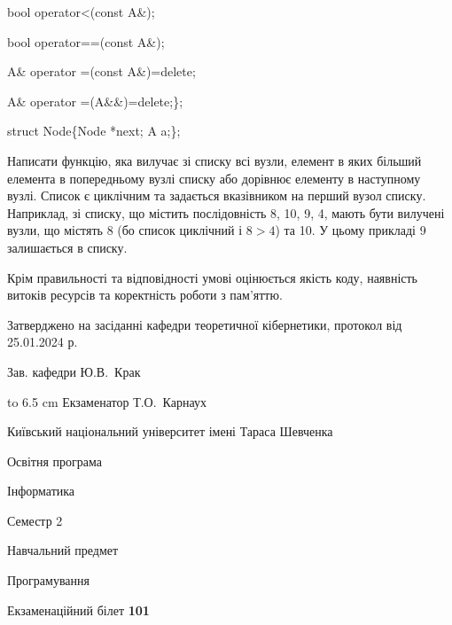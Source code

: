 \documentclass[12pt, ukrainian]{article}
\begin{document}
{\quad  bool operator<(const A\&); 

\quad  bool operator==(const A\&); 

\quad A\& operator =(const A\&)=delete; 

\quad  A\& operator =(A\&\&)=delete;\};

struct Node\{Node *next; A a;\};

 Написати функцію, яка вилучає зі списку всі вузли, елемент в яких більший елемента в попередньому вузлі списку або дорівнює елементу в наступному вузлі. Список є циклічним та задається вказівником на перший вузол списку. Наприклад, зі списку, що містить послідовність 8, 10, 9, 4, мають бути вилучені вузли, що містять 8 (бо список циклічний і $8>4$) та 10. У цьому прикладі 9 залишається в списку.

Крім правильності та відповідності умові оцінюється якість коду, наявність витоків ресурсів та коректність роботи з пам'яттю. 

}
{\smallskip\smallskip \begin {scriptsize} Затверджено на засіданні кафедри теоретичної кібернетики, протокол   від   25.01.2024 р.\par\smallskip\smallskip\smallskip\smallskip
{\parbox {6.5 cm} {Зав. кафедри \dotfill Ю.В.~Крак}}\hspace {0.7cm} {\hbox to 6.5 cm { Екзаменатор \dotfill Т.О.~Карнаух}} \end{scriptsize}}
\newpage
{{\begin {scriptsize}\par
{ \center  Київський національний університет імені Тараса Шевченка \par}
{\parbox {5 cm}{Освітня програма \hfill}{\parbox {7 cm}{Інформатика\hfill}}\parbox {6 cm}{\hfill Семестр 2}}\par
{\parbox {5 cm} {Навчальний предмет \hfill}\parbox {7 cm}{Програмування \hfill}\parbox {6cm}{\hfill}\par}\vspace{-15pt} \end{scriptsize}}{\center Екзаменаційний білет \No \textbf { 101 }\par}}
\end{document}
